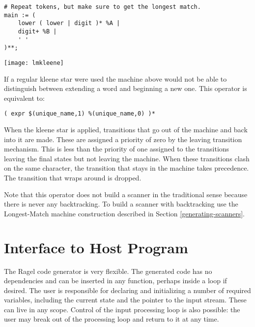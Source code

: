\documentclass[letterpaper,11pt,oneside]{book}
\newcommand{\verbspace}{\vspace{10pt}}
\newcommand{\graphspace}{\vspace{10pt}}
\newenvironment{inline_code}{\def\baselinestretch{1}\vspace{12pt}\small}{}
\begin{document}
\begin{inline_code}
\begin{verbatim}
# Repeat tokens, but make sure to get the longest match.
main := (
    lower ( lower | digit )* %A | 
    digit+ %B | 
    ' '
)**;
\end{verbatim}
\end{inline_code}

\begin{center}
\texttt{[image: lmkleene]}
\end{center}
\graphspace

If a regular kleene star were used the machine above would not be able to
distinguish between extending a word and beginning a new one.  This operator is
equivalent to:

\verbspace
\begin{verbatim}
( expr $(unique_name,1) %(unique_name,0) )*
\end{verbatim}
\verbspace

When the kleene star is applied, transitions that go out of the machine and
back into it are made. These are assigned a priority of zero by the leaving 
transition mechanism. This is less than the priority of one assigned to the
transitions leaving the final states but not leaving the machine. When 
these transitions clash on the same character, the 
transition that stays in the machine takes precedence.  The transition
that wraps around is dropped.

Note that this operator does not build a scanner in the traditional sense
because there is never any backtracking. To build a scanner with backtracking
use the Longest-Match machine construction described in Section
\ref{generating-scanners}.

\chapter{Interface to Host Program}

The Ragel code generator is very flexible. The generated code has no
dependencies and can be inserted in any function, perhaps inside a loop if
desired.  The user is responsible for declaring and initializing a number of
required variables, including the current state and the pointer to the input
stream. These can live in any scope. Control of the input processing loop is
also possible: the user may break out of the processing loop and return to it
at any time.
\end{document}

